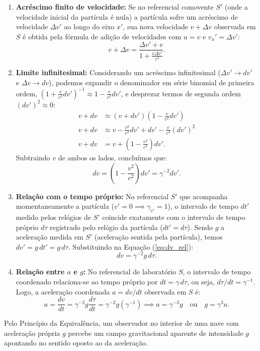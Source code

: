 \documentclass[11pt, a4paper]{article}
\begin{document}
\begin{enumerate}[label=\alph*)]
    \item \textbf{Acréscimo finito de velocidade:} Se no referencial comovente $S'$ (onde a velocidade inicial da partícula é nula) a partícula sofre um acréscimo de velocidade $\Delta v'$ ao longo do eixo $x'$, sua nova velocidade $v + \Delta v$ observada em $S$ é obtida pela fórmula de adição de velocidades com $u = v$ e $v_x' = \Delta v'$:
    \begin{equation}
    v + \Delta v = \frac{\Delta v' + v}{1 + \frac{v \Delta v'}{c^2}}.
    \end{equation}

    \item \textbf{Limite infinitesimal:} Considerando um acréscimo infinitesimal ($\Delta v' \to dv'$ e $\Delta v \to dv$), podemos expandir o denominador em série binomial de primeira ordem, $(1 + \frac{v}{c^2} dv')^{-1} \approx 1 - \frac{v}{c^2} dv'$, e desprezar termos de segunda ordem $(dv')^2 \approx 0$:
    \begin{align}
    v + dv &\approx (v + dv') \left( 1 - \frac{v}{c^2} dv' \right) \nonumber \\
    v + dv &\approx v - \frac{v^2}{c^2} dv' + dv' - \frac{v}{c^2} (dv')^2 \nonumber \\
    v + dv &= v + \left( 1 - \frac{v^2}{c^2} \right) dv'.
    \end{align}
    Subtraindo $v$ de ambos os lados, concluímos que:
    \begin{equation}
    dv = \left( 1 - \frac{v^2}{c^2} \right) dv' = \gamma^{-2} dv'. \label{eq:dv_rel}
    \end{equation}

    \item \textbf{Relação com o tempo próprio:} No referencial $S'$ que acompanha momentaneamente a partícula ($v' = 0 \implies \gamma_{v'} = 1$), o intervalo de tempo $dt'$ medido pelos relógios de $S'$ coincide exatamente com o intervalo de tempo próprio $d\tau$ registrado pelo relógio da partícula ($dt' = d\tau$). Sendo $g$ a aceleração medida em $S'$ (aceleração sentida pela partícula), temos $dv' = g \, dt' = g \, d\tau$. Substituindo na Equação (\ref{eq:dv_rel}):
    \begin{equation}
    dv = \gamma^{-2} g \, d\tau.
    \end{equation}

    \item \textbf{Relação entre $a$ e $g$:} No referencial de laboratório $S$, o intervalo de tempo coordenado relaciona-se ao tempo próprio por $dt = \gamma \, d\tau$, ou seja, $d\tau / dt = \gamma^{-1}$. Logo, a aceleração coordenada $a = dv/dt$ observada em $S$ é:
    \begin{equation}
    a = \frac{dv}{dt} = \gamma^{-2} g \frac{d\tau}{dt} = \gamma^{-2} g (\gamma^{-1}) \implies a = \gamma^{-3} g \quad \text{ou} \quad g = \gamma^3 a.
    \end{equation}
\end{enumerate}
Pelo Princípio da Equivalência, um observador no interior de uma nave com aceleração própria $g$ percebe um campo gravitacional aparente de intensidade $g$ apontando no sentido oposto ao da aceleração.
\end{document}
